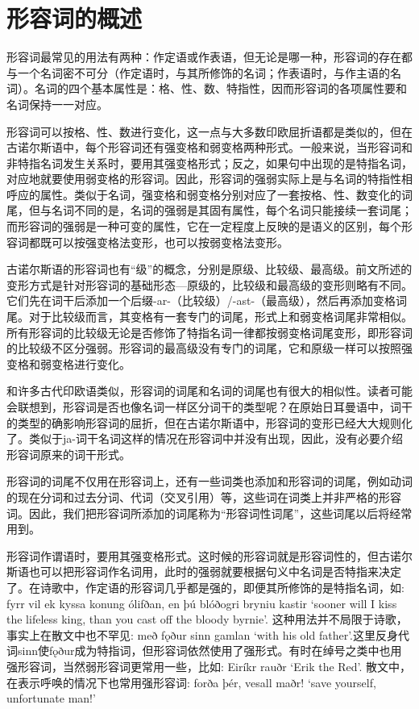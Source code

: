 \section{形容词的概述}\label{形容词的概述}

形容词最常见的用法有两种：作定语或作表语，但无论是哪一种，形容词的存在都与一个名词密不可分（作定语时，与其所修饰的名词；作表语时，与作主语的名词）。名词的四个基本属性是：格、性、数、特指性，因而形容词的各项属性要和名词保持一一对应。

形容词可以按格、性、数进行变化，这一点与大多数印欧屈折语都是类似的，但在古诺尔斯语中，每个形容词还有强变格和弱变格两种形式。一般来说，当形容词和非特指名词发生关系时，要用其强变格形式；反之，如果句中出现的是特指名词，对应地就要使用弱变格的形容词。因此，形容词的强弱实际上是与名词的特指性相呼应的属性。类似于名词，强变格和弱变格分别对应了一套按格、性、数变化的词尾，但与名词不同的是，名词的强弱是其固有属性，每个名词只能接续一套词尾；而形容词的强弱是一种可变的属性，它在一定程度上反映的是语义的区别，每个形容词都既可以按强变格法变形，也可以按弱变格法变形。

古诺尔斯语的形容词也有``级''的概念，分别是原级、比较级、最高级。前文所述的变形方式是针对形容词的基础形态---原级的，比较级和最高级的变形则略有不同。它们先在词干后添加一个后缀-ar-（比较级）/-ast-（最高级），然后再添加变格词尾。对于比较级而言，其变格有一套专门的词尾，形式上和弱变格词尾非常相似。所有形容词的比较级无论是否修饰了特指名词一律都按弱变格词尾变形，即形容词的比较级不区分强弱。形容词的最高级没有专门的词尾，它和原级一样可以按照强变格和弱变格进行变化。

和许多古代印欧语类似，形容词的词尾和名词的词尾也有很大的相似性。读者可能会联想到，形容词是否也像名词一样区分词干的类型呢？在原始日耳曼语中，词干的类型的确影响形容词的屈折，但在古诺尔斯语中，形容词的变形已经大大规则化了。类似于ja-词干名词这样的情况在形容词中并没有出现，因此，没有必要介绍形容词原来的词干形式。

形容词的词尾不仅用在形容词上，还有一些词类也添加和形容词的词尾，例如动词的现在分词和过去分词、代词（交叉引用）等，这些词在词类上并非严格的形容词。因此，我们把形容词所添加的词尾称为``形容词性词尾''，这些词尾以后将经常用到。

形容词作谓语时，要用其强变格形式。这时候的形容词就是形容词性的，但古诺尔斯语也可以把形容词作名词用，此时的强弱就要根据句义中名词是否特指来决定了。在诗歌中，作定语的形容词几乎都是强的，即便其所修饰的是特指名词，如:
fyrr vil ek kyssa konung ólifðan, en þú blóðogri bryniu kastir `sooner
will I kiss the lifeless king, than you cast off the bloody byrnie‌'.
这种用法并不局限于诗歌，事实上在散文中也不罕见: með fǫður sinn gamlan
`with his old
father‌'.这里反身代词sinn使fǫður成为特指词，但形容词依然使用了强形式。有时在绰号之类中也用强形容词，当然弱形容词更常用一些，比如:
Eiríkr rauðr `Erik the Red‌'. 散文中，在表示呼唤的情况下也常用强形容词:
forða þér, vesall maðr! `save yourself, unfortunate man!‌'

